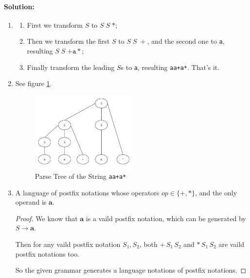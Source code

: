 \documentclass[scheme=plain,12pt]{ctexart}
\begin{document}
    \paragraph*{Solution: }
    \begin{enumerate}
        \item \begin{enumerate}
                \item First we transform $S$ to $S\;S\;\mathtt{*}$;
                \item Then we transform the first $S$ to $S\;S\;+$, and the second one to \verb|a|, resulting $S\;S\;\mathtt{+a*}$;
                \item Finally transform the leading $S$s to \verb|a|, resulting \verb|aa+a*|. That's it.
              \end{enumerate}
        \item See figure \ref{fig:t1-1}.
              \begin{figure}[h]
                \centering
                \includegraphics[width=0.5\textwidth]{pics/t1-1.png}
                \caption{Parse Tree of the String \texttt{aa+a*}}
                \label{fig:t1-1}
              \end{figure}
        \item A language of postfix notations whose operators $op \in \{+, *\}$, and the only operand is $\mathbf{a}$.
        \begin{proof}
            We know that $\mathbf{a}$ is a vaild postfix notation, which can be generated by $S \to \mathbf{a}$.

            Then for any vaild postfix notation $S_1, S_2$, both $+\,S_1\,S_2$ and $*\,S_1\,S_2$ are vaild postfix notations too.
            
            So the given grammar generates a language notations of postfix notations.
        \end{proof}
    \end{enumerate}

    \newpage
\end{document}
